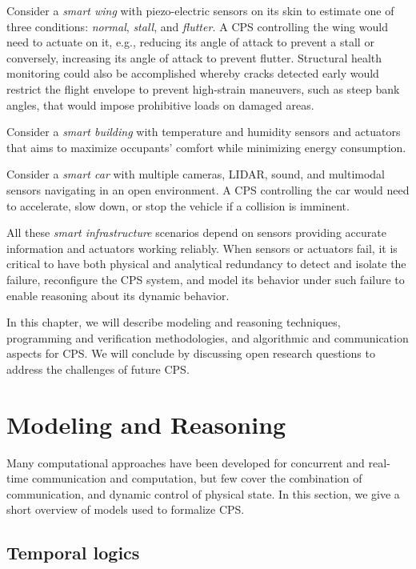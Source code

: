 \documentclass[
graybox,
envcountchap
]{svmult}
\begin{document}
\begin{bibunit}

Consider a {\it smart wing} with piezo-electric sensors on its skin to estimate one of three conditions:  {\it normal}, {\it stall}, and {\it flutter.}  A CPS controlling the wing would need to actuate on it, e.g., reducing its angle of attack to prevent a stall or conversely, increasing its angle of attack to prevent flutter.  Structural health monitoring could also be accomplished whereby cracks detected early would restrict the flight envelope to prevent high-strain maneuvers, such as steep bank angles, that would impose prohibitive loads on damaged areas.

Consider a {\it smart building} with temperature and humidity sensors and actuators that aims to maximize occupants' comfort while minimizing energy consumption.  

Consider a {\it smart car} with multiple cameras, LIDAR, sound, and multimodal sensors navigating in an open environment.  A CPS controlling the car would need to accelerate, slow down, or stop the vehicle if a collision is imminent.

All these {\it smart infrastructure} scenarios depend on sensors providing accurate information and actuators working reliably.  When sensors or actuators fail, it is critical to have both physical and analytical redundancy to detect and isolate the failure, reconfigure the CPS system, and model its behavior under such failure to enable reasoning about its dynamic behavior.

In this chapter, we will describe modeling and reasoning techniques, programming and verification methodologies, and algorithmic and communication aspects for CPS.  We will conclude by discussing open research questions to address the challenges of future CPS.

\section{Modeling and Reasoning} %

Many computational approaches have been developed for concurrent and real-time communication and computation, but few cover the combination of communication, and dynamic control of physical state.
In this section, we give a short overview of models used to formalize CPS.

     \subsection{Temporal logics}
     

\end{bibunit}
\end{document}

